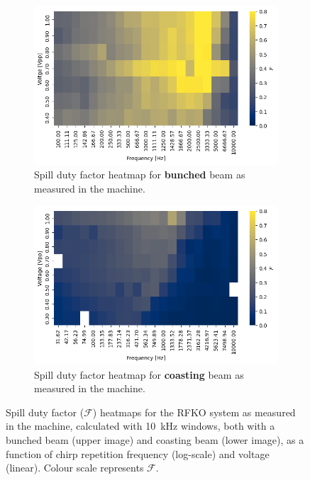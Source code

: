 \documentclass[a4paper,twoside,11pt]{report}
\begin{document}
\begin{figure}[h]
  \centering
  \begin{subfigure}[b]{0.9\linewidth}
    \includegraphics*[width=\linewidth]{rf_on_heatmap_10.png}
    \caption{Spill duty factor heatmap for \textbf{bunched} beam as measured in the machine.}\label{sdf_on_meas}
  \end{subfigure}
  \begin{subfigure}[b]{0.9\linewidth}
    \includegraphics*[width=\linewidth]{rf_off_heatmap_10.png}
    \caption{Spill duty factor heatmap for \textbf{coasting} beam as measured in the machine.}\label{sdf_off_meas}
  \end{subfigure}
  \cprotect\caption[Spill duty factor heatmaps for bunched and coasting beams]{Spill duty factor ($\mathcal{F}$) heatmaps for the RFKO system as measured in the machine, calculated with \qty{10}{\kilo\hertz} windows, both with a bunched beam (upper image) and coasting beam (lower image), as a function of chirp repetition frequency (log-scale) and voltage (linear). Colour scale represents $\mathcal{F}$.}\label{fig:sdf_meas}
\end{figure}
\end{document}
